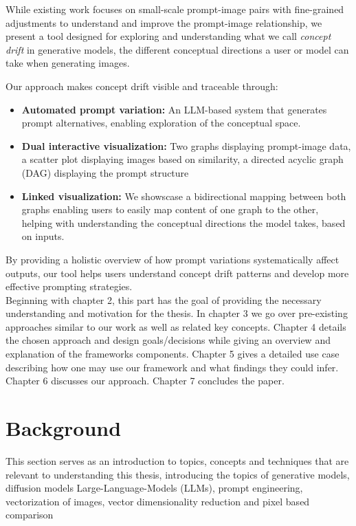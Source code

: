 \documentclass[
  a4paper,  %
  twoside,  %
  bibliography=totoc,
  headsepline,
  cleardoublepage=empty,
  parskip=half,
  draft=false
]{scrbook}
\begin{document}
While existing work focuses on small-scale prompt-image pairs with fine-grained adjustments to understand and improve the prompt-image relationship, we present a tool designed for exploring and understanding what we call \textit{concept drift} in generative models, the different conceptual directions a user or model can take when generating images.

Our approach makes concept drift visible and traceable through:
\begin{itemize}
	\item \textbf{Automated prompt variation:} An LLM-based system that generates prompt alternatives, enabling exploration of the conceptual space.
	\item \textbf{Dual interactive visualization:} Two graphs displaying prompt-image data, a scatter plot displaying images based on similarity, a directed acyclic graph (DAG) displaying the prompt structure 
	\item \textbf{Linked visualization:} We showscase a bidirectional mapping between both graphs enabling users to easily map content of one graph to the other, helping with understanding the conceptual directions the model takes, based on inputs.
\end{itemize}

By providing a holistic overview of how prompt variations systematically affect outputs, our tool helps users understand concept drift patterns and develop more effective prompting strategies. \\
Beginning with chapter 2, this part has the goal of providing the necessary understanding and motivation for the thesis. In chapter 3 we go over pre-existing approaches similar to our work as well as related key concepts. Chapter 4 details the chosen approach and design goals/decisions while giving an overview and explanation of the frameworks components. Chapter 5 gives a detailed use case describing how one may use our framework and what findings they could infer. Chapter 6 discusses our approach. Chapter 7 concludes the paper.

\chapter{Background}
\label{chap:k2}
This section serves as an introduction to topics, concepts and techniques that are relevant to understanding this thesis, introducing the topics of generative models, diffusion models Large-Language-Models (LLMs), prompt engineering, vectorization of images, vector dimensionality reduction and pixel based comparison
\end{document}
